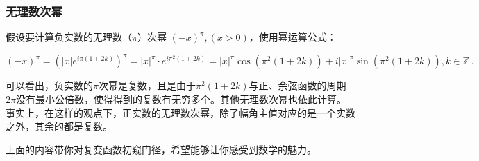 \subsubsection{无理数次幂}

假设要计算负实数的无理数（$\pi$）次幂 $(-x)^\pi,(x>0)$，使用幂运算公式：

\begin{equation}
(-x)^\pi = \left( |x| e^{i\pi(1+2k)} \right)^\pi =|x|^\pi \cdot e^{i\pi^2(1+2k)}=|x|^\pi\cos(\pi^2(1+2k)) + i|x|^\pi\sin(\pi^2(1+2k)),k\in\mathbb{Z}~.
\end{equation}

可以看出，负实数的$\pi$次幂是复数，且是由于$\pi^2(1+2k)$与正、余弦函数的周期$2\pi$没有最小公倍数，使得得到的复数有无穷多个。其他无理数次幂也依此计算。事实上，在这样的观点下，正实数的无理数次幂，除了幅角主值对应的是一个实数之外，其余的都是复数。

上面的内容带你对复变函数初窥门径，希望能够让你感受到数学的魅力。